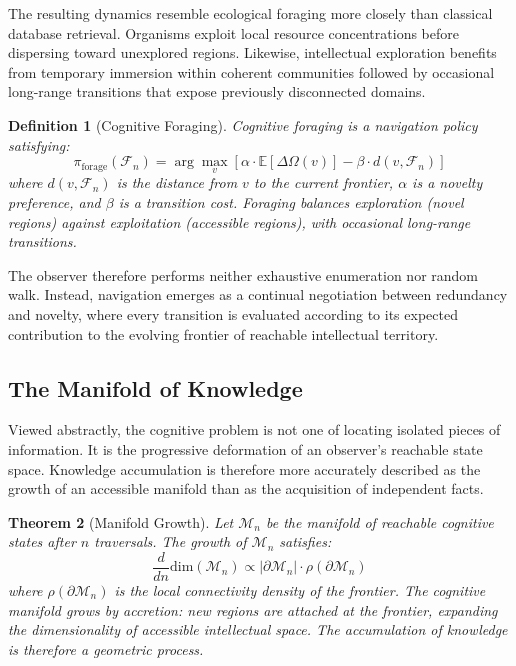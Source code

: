 \documentclass[12pt,oneside]{article}
\newtheorem{definition}{Definition}[section]
\newtheorem{theorem}[definition]{Theorem}
\theoremstyle{remark}
\begin{document}
The resulting dynamics resemble ecological foraging more closely than classical database retrieval. Organisms exploit local resource concentrations before dispersing toward unexplored regions. Likewise, intellectual exploration benefits from temporary immersion within coherent communities followed by occasional long-range transitions that expose previously disconnected domains.

\begin{definition}[Cognitive Foraging]
Cognitive foraging is a navigation policy satisfying:
\[
\pi_{\text{forage}}(\mathcal{F}_n) = \arg\max_v \left[ \alpha \cdot \mathbb{E}[\Delta\Omega(v)] - \beta \cdot d(v, \mathcal{F}_n) \right]
\]
where \(d(v, \mathcal{F}_n)\) is the distance from \(v\) to the current frontier, \(\alpha\) is a novelty preference, and \(\beta\) is a transition cost. Foraging balances exploration (novel regions) against exploitation (accessible regions), with occasional long-range transitions.
\end{definition}

The observer therefore performs neither exhaustive enumeration nor random walk. Instead, navigation emerges as a continual negotiation between redundancy and novelty, where every transition is evaluated according to its expected contribution to the evolving frontier of reachable intellectual territory.

\subsection{The Manifold of Knowledge}

Viewed abstractly, the cognitive problem is not one of locating isolated pieces of information. It is the progressive deformation of an observer's reachable state space. Knowledge accumulation is therefore more accurately described as the growth of an accessible manifold than as the acquisition of independent facts.

\begin{theorem}[Manifold Growth]
Let \(\mathcal{M}_n\) be the manifold of reachable cognitive states after \(n\) traversals. The growth of \(\mathcal{M}_n\) satisfies:
\[
\frac{d}{dn} \text{dim}(\mathcal{M}_n) \propto |\partial \mathcal{M}_n| \cdot \rho(\partial \mathcal{M}_n)
\]
where \(\rho(\partial \mathcal{M}_n)\) is the local connectivity density of the frontier. The cognitive manifold grows by accretion: new regions are attached at the frontier, expanding the dimensionality of accessible intellectual space. The accumulation of knowledge is therefore a geometric process.
\end{theorem}
\end{document}
